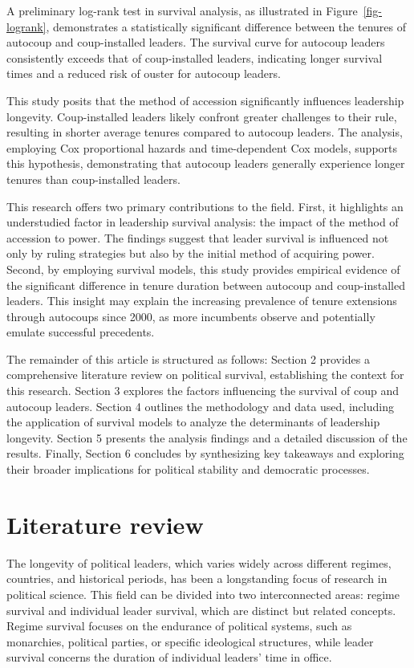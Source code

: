 \documentclass[
  12pt,
]{article}
\begin{document}
A preliminary log-rank test in survival analysis, as illustrated in
Figure~\ref{fig-logrank}, demonstrates a statistically significant
difference between the tenures of autocoup and coup-installed leaders.
The survival curve for autocoup leaders consistently exceeds that of
coup-installed leaders, indicating longer survival times and a reduced
risk of ouster for autocoup leaders.

This study posits that the method of accession significantly influences
leadership longevity. Coup-installed leaders likely confront greater
challenges to their rule, resulting in shorter average tenures compared
to autocoup leaders. The analysis, employing Cox proportional hazards
and time-dependent Cox models, supports this hypothesis, demonstrating
that autocoup leaders generally experience longer tenures than
coup-installed leaders.

This research offers two primary contributions to the field. First, it
highlights an understudied factor in leadership survival analysis: the
impact of the method of accession to power. The findings suggest that
leader survival is influenced not only by ruling strategies but also by
the initial method of acquiring power. Second, by employing survival
models, this study provides empirical evidence of the significant
difference in tenure duration between autocoup and coup-installed
leaders. This insight may explain the increasing prevalence of tenure
extensions through autocoups since 2000, as more incumbents observe and
potentially emulate successful precedents.

The remainder of this article is structured as follows: Section 2
provides a comprehensive literature review on political survival,
establishing the context for this research. Section 3 explores the
factors influencing the survival of coup and autocoup leaders. Section 4
outlines the methodology and data used, including the application of
survival models to analyze the determinants of leadership longevity.
Section 5 presents the analysis findings and a detailed discussion of
the results. Finally, Section 6 concludes by synthesizing key takeaways
and exploring their broader implications for political stability and
democratic processes.

\section{Literature review}\label{literature-review}

The longevity of political leaders, which varies widely across different
regimes, countries, and historical periods, has been a longstanding
focus of research in political science. This field can be divided into
two interconnected areas: regime survival and individual leader
survival, which are distinct but related concepts. Regime survival
focuses on the endurance of political systems, such as monarchies,
political parties, or specific ideological structures, while leader
survival concerns the duration of individual leaders' time in office.
\end{document}
